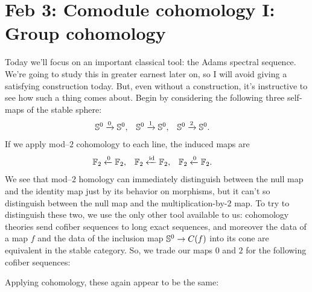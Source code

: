 





\section{Feb 3: Comodule cohomology I: Group cohomology}

 Today we'll focus on an important classical tool: the Adams spectral sequence.  We're going to study this in greater earnest later on, so I will avoid giving a satisfying construction today.  But, even without a construction, it's instructive to see how such a thing comes about.    Begin by considering the following three self-maps of the stable sphere:
\begin{align*}
\S^0 & \xrightarrow{0} \S^0, & \S^0 & \xrightarrow{1} \S^0, & \S^0 & \xrightarrow{2} \S^0.
\end{align*}
If we apply mod--$2$ cohomology to each line, the induced maps are
\begin{align*}
\F_2 & \xleftarrow{0} \F_2, & \F_2 & \xleftarrow{\id} \F_2, & \F_2 & \xleftarrow{0} \F_2.
\end{align*}
We see that mod--$2$ homology can immediately distinguish between the null map and the identity map just by its behavior on morphisms, but it can't so distinguish between the null map and the multiplication-by-$2$ map.  To try to distinguish these two, we use the only other tool available to us: cohomology theories send cofiber sequences to long exact sequences, and moreover the data of a map $f$ and the data of the inclusion map $\S^0 \to C(f)$ into its cone are equivalent in the stable category.  So, we trade our maps $0$ and $2$ for the following cofiber sequences:
\begin{center}
\end{center}
Applying cohomology, these again appear to be the same:
\begin{center}
\end{center}

